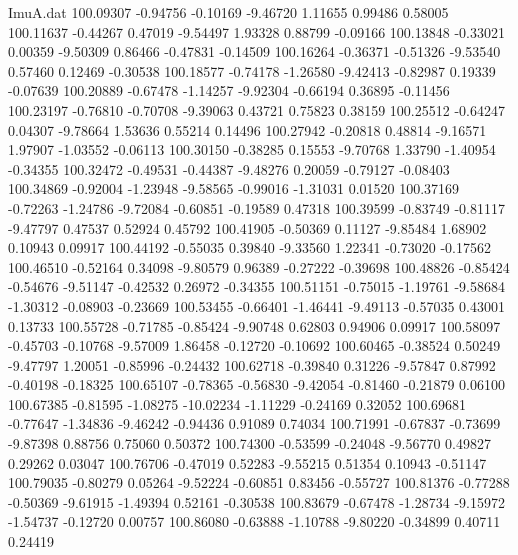 \begin{filecontents}{ImuA.dat}
 100.09307   -0.94756   -0.10169   -9.46720    1.11655    0.99486    0.58005
 100.11637   -0.44267    0.47019   -9.54497    1.93328    0.88799   -0.09166
 100.13848   -0.33021    0.00359   -9.50309    0.86466   -0.47831   -0.14509
 100.16264   -0.36371   -0.51326   -9.53540    0.57460    0.12469   -0.30538
 100.18577   -0.74178   -1.26580   -9.42413   -0.82987    0.19339   -0.07639
 100.20889   -0.67478   -1.14257   -9.92304   -0.66194    0.36895   -0.11456
 100.23197   -0.76810   -0.70708   -9.39063    0.43721    0.75823    0.38159
 100.25512   -0.64247    0.04307   -9.78664    1.53636    0.55214    0.14496
 100.27942   -0.20818    0.48814   -9.16571    1.97907   -1.03552   -0.06113
 100.30150   -0.38285    0.15553   -9.70768    1.33790   -1.40954   -0.34355
 100.32472   -0.49531   -0.44387   -9.48276    0.20059   -0.79127   -0.08403
 100.34869   -0.92004   -1.23948   -9.58565   -0.99016   -1.31031    0.01520
 100.37169   -0.72263   -1.24786   -9.72084   -0.60851   -0.19589    0.47318
 100.39599   -0.83749   -0.81117   -9.47797    0.47537    0.52924    0.45792
 100.41905   -0.50369    0.11127   -9.85484    1.68902    0.10943    0.09917
 100.44192   -0.55035    0.39840   -9.33560    1.22341   -0.73020   -0.17562
 100.46510   -0.52164    0.34098   -9.80579    0.96389   -0.27222   -0.39698
 100.48826   -0.85424   -0.54676   -9.51147   -0.42532    0.26972   -0.34355
 100.51151   -0.75015   -1.19761   -9.58684   -1.30312   -0.08903   -0.23669
 100.53455   -0.66401   -1.46441   -9.49113   -0.57035    0.43001    0.13733
 100.55728   -0.71785   -0.85424   -9.90748    0.62803    0.94906    0.09917
 100.58097   -0.45703   -0.10768   -9.57009    1.86458   -0.12720   -0.10692
 100.60465   -0.38524    0.50249   -9.47797    1.20051   -0.85996   -0.24432
 100.62718   -0.39840    0.31226   -9.57847    0.87992   -0.40198   -0.18325
 100.65107   -0.78365   -0.56830   -9.42054   -0.81460   -0.21879    0.06100
 100.67385   -0.81595   -1.08275  -10.02234   -1.11229   -0.24169    0.32052
 100.69681   -0.77647   -1.34836   -9.46242   -0.94436    0.91089    0.74034
 100.71991   -0.67837   -0.73699   -9.87398    0.88756    0.75060    0.50372
 100.74300   -0.53599   -0.24048   -9.56770    0.49827    0.29262    0.03047
 100.76706   -0.47019    0.52283   -9.55215    0.51354    0.10943   -0.51147
 100.79035   -0.80279    0.05264   -9.52224   -0.60851    0.83456   -0.55727
 100.81376   -0.77288   -0.50369   -9.61915   -1.49394    0.52161   -0.30538
 100.83679   -0.67478   -1.28734   -9.15972   -1.54737   -0.12720    0.00757
 100.86080   -0.63888   -1.10788   -9.80220   -0.34899    0.40711    0.24419

\end{filecontents}

